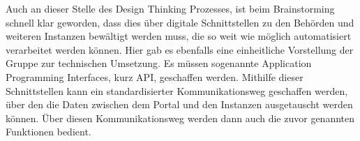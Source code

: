 Auch an dieser Stelle des Design Thinking Prozesses, ist beim Brainstorming schnell klar geworden, dass dies über digitale Schnittstellen zu den Behörden und weiteren Instanzen bewältigt werden muss, die so weit wie möglich automatisiert verarbeitet werden können. Hier gab es ebenfalls eine einheitliche Vorstellung der Gruppe zur technischen Umsetzung. Es müssen sogenannte Application Programming Interfaces, kurz API, geschaffen werden. Mithilfe dieser Schnittstellen kann ein standardisierter Kommunikationsweg geschaffen werden, über den die Daten zwischen dem Portal und den Instanzen ausgetauscht werden können. Über diesen Kommunikationsweg werden dann auch die zuvor genannten Funktionen bedient.